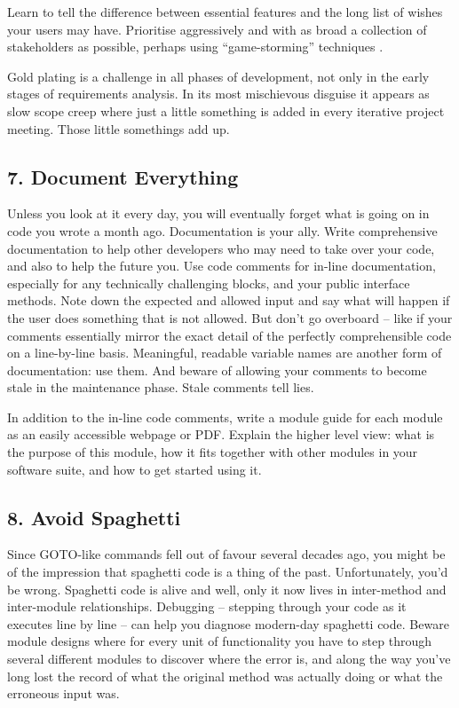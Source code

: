 \documentclass{bmcart}
\begin{document}
Learn to tell the difference between essential features and the long list of wishes your users may have. Prioritise aggressively and with as broad a collection of stakeholders as possible, perhaps using ``game-storming'' techniques \cite{gamestorm}.   

Gold plating is a challenge in all phases of development, not only in the early stages of requirements analysis. In its most mischievous disguise it appears as slow scope creep where just a little something is added in every iterative project meeting. Those little somethings add up. 

\subsection*{7. Document Everything}

Unless you look at it every day, you will eventually forget what is going on in code you wrote a month ago. Documentation is your ally. Write comprehensive documentation to help other developers who may need to take over your code, and also to help the future you. Use code comments for in-line documentation, especially for any technically challenging blocks, and your public interface methods. Note down the expected and allowed input and say what will happen if the user does something that is not allowed. But don't go overboard -- like if your comments essentially mirror the exact detail of the perfectly comprehensible code on a line-by-line basis. Meaningful, readable variable names are another form of documentation: use them. And beware of allowing your comments to become stale in the maintenance phase. Stale comments tell lies. 

In addition to the in-line code comments, write a module guide for each module as an easily accessible webpage or PDF. Explain the higher level view: what is the purpose of this module, how it fits together with other modules in your software suite, and how to get started using it. 

\subsection*{8. Avoid Spaghetti}

Since GOTO-like commands fell out of favour several decades ago, you might be of the impression that spaghetti code is a thing of the past. Unfortunately, you'd be wrong. Spaghetti code is alive and well, only it now lives in inter-method and inter-module relationships. Debugging -- stepping through your code as it executes line by line -- can help you diagnose modern-day spaghetti code. Beware module designs where for every unit of functionality you have to step through several different modules to discover where the error is, and along the way you've long lost the record of what the original method was actually doing or what the erroneous input was. 
\end{document}
